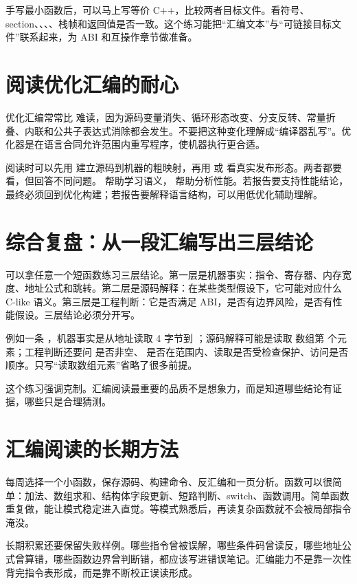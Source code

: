 手写最小函数后，可以马上写等价 C++，比较两者目标文件。看符号、section、、、、栈帧和返回值是否一致。这个练习能把“汇编文本”与“可链接目标文件”联系起来，为 ABI 和互操作章节做准备。

\section{阅读优化汇编的耐心}

优化汇编常常比  难读，因为源码变量消失、循环形态改变、分支反转、常量折叠、内联和公共子表达式消除都会发生。不要把这种变化理解成“编译器乱写”。优化器是在语言合同允许范围内重写程序，使机器执行更合适。

阅读时可以先用  建立源码到机器的粗映射，再用  或  看真实发布形态。两者都要看，但回答不同问题。 帮助学习语义， 帮助分析性能。若报告要支持性能结论，最终必须回到优化构建；若报告要解释语言结构，可以用低优化辅助理解。

\section{综合复盘：从一段汇编写出三层结论}

可以拿任意一个短函数练习三层结论。第一层是机器事实：指令、寄存器、内存宽度、地址公式和跳转。第二层是源码解释：在某些类型假设下，它可能对应什么 C-like 语义。第三层是工程判断：它是否满足 ABI，是否有边界风险，是否有性能假设。三层结论必须分开写。

例如一条 ，机器事实是从地址读取 4 字节到 ；源码解释可能是读取  数组第  个元素；工程判断还要问  是否非空、 是否在范围内、读取是否受检查保护、访问是否顺序。只写“读取数组元素”省略了很多前提。

这个练习强调克制。汇编阅读最重要的品质不是想象力，而是知道哪些结论有证据，哪些只是合理猜测。

\section{汇编阅读的长期方法}

每周选择一个小函数，保存源码、构建命令、反汇编和一页分析。函数可以很简单：加法、数组求和、结构体字段更新、短路判断、switch、函数调用。简单函数重复做，能让模式稳定进入直觉。等模式熟悉后，再读复杂函数就不会被局部指令淹没。

长期积累还要保留失败样例。哪些指令曾被误解，哪些条件码曾读反，哪些地址公式曾算错，哪些函数边界曾判断错，都应该写进错误笔记。汇编能力不是靠一次性背完指令表形成，而是靠不断校正误读形成。

